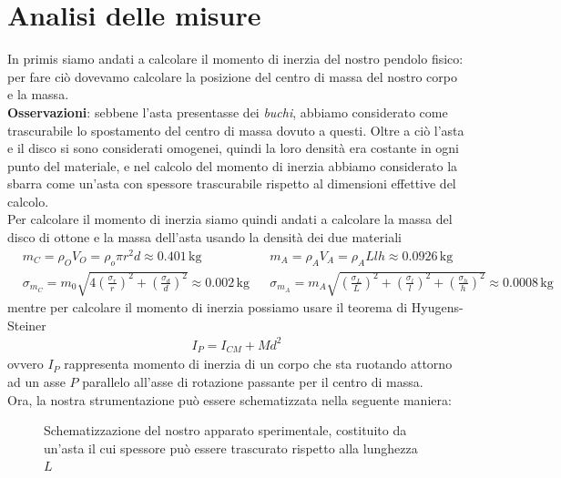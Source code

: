 \documentclass{article}
\begin{document}
\section{Analisi delle misure}

In primis siamo andati a calcolare il momento di inerzia del nostro pendolo fisico: per fare ciò dovevamo calcolare la posizione del centro di massa del nostro corpo e la massa. \\
\textbf{Osservazioni}: sebbene l'asta presentasse dei \emph{buchi}, abbiamo considerato come trascurabile lo spostamento del centro di massa dovuto a questi. Oltre a ciò l'asta e il disco si sono considerati omogenei, quindi la loro densità era costante in ogni punto del materiale, e nel calcolo del momento di inerzia abbiamo considerato la sbarra come un'asta con spessore trascurabile rispetto al dimensioni effettive del calcolo. \\
Per calcolare il momento di inerzia siamo quindi andati a calcolare la massa del disco di ottone e la massa dell'asta usando la densità dei due materiali
\begin{align*}
	&m_C = \rho_O V_O = \rho_o \pi r^2 d \approx 0.401 \, \si{\kilogram} & &m_A = \rho_A V_A = \rho_A Llh \approx 0.0926 \, \si{\kilogram} \\
	&\sigma_{m_C} = m_0 \sqrt{4 \left(\frac{\sigma_r}{r} \right)^2 + \left( \frac{\sigma_d}{d} \right)^2} \approx 0.002 \, \si{\kilogram} & &\sigma_{m_A} = m_A \sqrt{ \left(\frac{\sigma_L}{L} \right)^2 + \left( \frac{\sigma_l}{l} \right)^2 + \left( \frac{\sigma_h}{h} \right)^2} \approx 0.0008 \, \si{\kilogram}
\end{align*}
mentre per calcolare il momento di inerzia possiamo usare il teorema di Hyugens-Steiner
\begin{align*}
	I_P = I_{CM} + Md^2
\end{align*}
ovvero $I_P$ rappresenta momento di inerzia di un corpo che sta ruotando attorno ad un asse $P$ parallelo all'asse di rotazione passante per il centro di massa. \\
Ora, la nostra strumentazione può essere schematizzata nella seguente maniera:
\begin{figure}[H]
	\centering
{}
\caption{Schematizzazione del nostro apparato sperimentale, costituito da un'asta il cui spessore può essere trascurato rispetto alla lunghezza $L$}
\end{figure}
\end{document}
